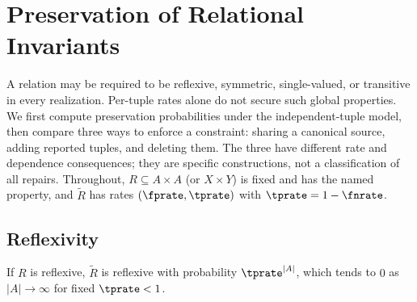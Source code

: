 %

\section{Preservation of Relational Invariants}
\label{sec:relation-invariants}

A relation may be required to be reflexive, symmetric, single-valued, or
transitive in every realization. Per-tuple rates alone do not secure such global
properties. We first compute preservation probabilities under the
independent-tuple model, then compare three ways to enforce a constraint:
sharing a canonical source, adding reported tuples, and deleting them. The three
have different rate and dependence consequences; they are specific constructions,
not a classification of all repairs. Throughout, $R \subseteq A \times A$ (or $X
\times Y$) is fixed and has the named property, and $\tilde R$ has rates
$(\fprate, \tprate)$ with $\tprate = 1 - \fnrate$.

\subsection*{Reflexivity}

\begin{theorem}[Reflexivity]
\label{thm:rel-reflexive}
If $R$ is reflexive, $\tilde R$ is reflexive with probability $\tprate^{|A|}$,
which tends to $0$ as $|A| \to \infty$ for fixed $\tprate < 1$.
\end{theorem}

